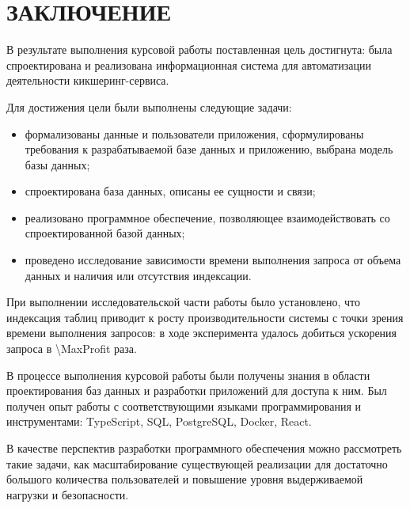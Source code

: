 \chapter*{ЗАКЛЮЧЕНИЕ}

В результате выполнения курсовой работы поставленная цель достигнута: была спроектирована и реализована информационная система для автоматизации деятельности кикшеринг-сервиса.

Для достижения цели были выполнены следующие задачи:

\begin{itemize}
    \item формализованы данные и пользователи приложения, сформулированы требования к разрабатываемой базе данных и приложению, выбрана модель базы данных;
    \item спроектирована база данных, описаны ее сущности и связи;
    \item реализовано программное обеспечение, позволяющее взаимодействовать со спроектированной базой данных;
    \item проведено исследование зависимости времени выполнения запроса от объема данных и наличия или отсутствия индексации.
\end{itemize}

При выполнении исследовательской части работы было установлено, что индексация таблиц приводит к росту производительности системы с точки зрения времени выполнения запросов: в ходе эксперимента удалось добиться ускорения запроса в \num[round-precision=0]{\MaxProfit} раза.

В процессе выполнения курсовой работы были получены знания в области проектирования баз данных и разработки приложений для доступа к ним. Был получен опыт работы с соответствующими языками программирования и инструментами: TypeScript, SQL, PostgreSQL, Docker, React.

В качестве перспектив разработки программного обеспечения можно рассмотреть такие задачи, как масштабирование существующей реализации для достаточно большого количества пользователей и повышение уровня выдерживаемой нагрузки и безопасности.